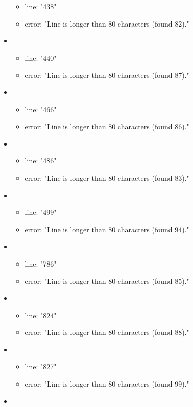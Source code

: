 \begin{itemize}
\begin{itemize}
		\item line: "438" 
		\item error: "Line is longer than 80 characters (found 82)." 
	\end{itemize}
	\item 
	\begin{itemize} 
		\item line: "440" 
		\item error: "Line is longer than 80 characters (found 87)." 
	\end{itemize}
	\item 
	\begin{itemize} 
		\item line: "466" 
		\item error: "Line is longer than 80 characters (found 86)." 
	\end{itemize}
	\item 
	\begin{itemize} 
		\item line: "486" 
		\item error: "Line is longer than 80 characters (found 83)." 
	\end{itemize}
	\item 
	\begin{itemize} 
		\item line: "499" 
		\item error: "Line is longer than 80 characters (found 94)." 
	\end{itemize}
	\item 
	\begin{itemize} 
		\item line: "786" 
		\item error: "Line is longer than 80 characters (found 85)." 
	\end{itemize}
	\item 
	\begin{itemize} 
		\item line: "824" 
		\item error: "Line is longer than 80 characters (found 88)." 
	\end{itemize}
	\item 
	\begin{itemize} 
		\item line: "827" 
		\item error: "Line is longer than 80 characters (found 99)." 
	\end{itemize}
	\item 
	\begin{itemize} 

\end{itemize}
\end{itemize}
